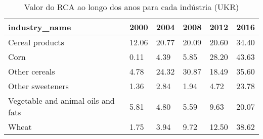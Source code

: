 \begin{table}
\centering
\caption{Valor do RCA ao longo dos anos para cada indústria (UKR)}
\begin{tabular}{p{6cm}p{1.5cm}p{1.5cm}p{1.5cm}p{1.5cm}p{1.5cm}}
\toprule
                     industry\_name &  2000 &  2004 &  2008 &  2012 &  2016 \\
\midrule
                   Cereal products & 12.06 & 20.77 & 20.09 & 20.60 & 34.40 \\
                              Corn &  0.11 &  4.39 &  5.85 & 28.20 & 43.63 \\
                     Other cereals &  4.78 & 24.32 & 30.87 & 18.49 & 35.60 \\
                  Other sweeteners &  1.36 &  2.84 &  1.94 &  4.72 & 23.78 \\
Vegetable and animal oils and fats &  5.81 &  4.80 &  5.59 &  9.63 & 20.07 \\
                             Wheat &  1.75 &  3.94 &  9.72 & 12.50 & 38.62 \\
\bottomrule
\end{tabular}
\end{table}
